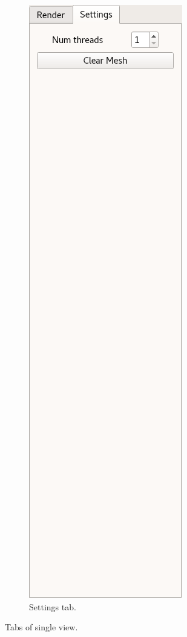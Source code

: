 \documentclass[12pt]{article}
\begin{document}
\begin{figure}
\begin{subfigure}{0.4\textwidth}
		\centering
		\includegraphics[scale=1]{SV-settings}
		\caption{Settings tab.}
	\end{subfigure}
	\caption{Tabs of single view.}
	\vspace{-30pt}
\end{figure}
\end{document}

